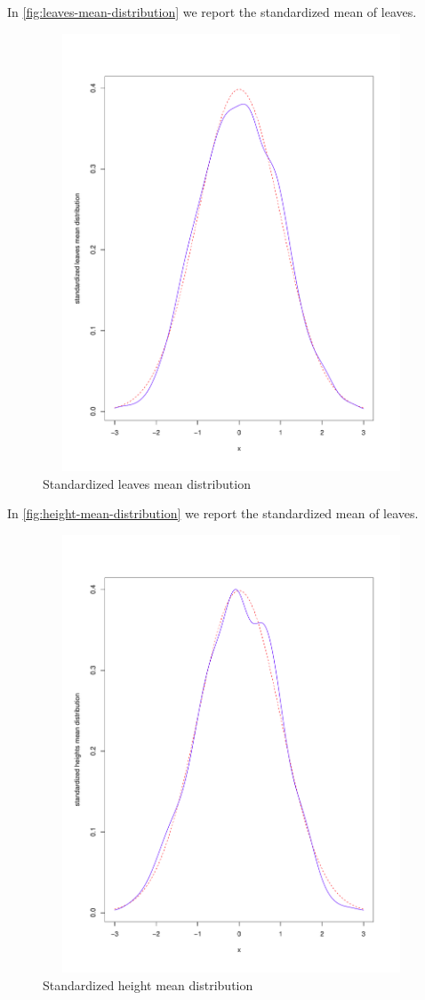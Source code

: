 In \autoref{fig:leaves-mean-distribution} we report the standardized
mean of leaves.
\begin{figure}[htb]
  \centering
  \includegraphics[height=13cm,
  width=13cm]{pictures/repeated-sampling-leaves-mean.pdf}
  \caption{Standardized leaves mean distribution}
  \label{fig:leaves-mean-distribution}
\end{figure}

In \autoref{fig:height-mean-distribution} we report the standardized
mean of leaves.
\begin{figure}[htb]
  \centering
  \includegraphics[height=13cm,
  width=13cm]{pictures/repeated-sampling-height-mean.pdf}
  \caption{Standardized height mean distribution}
  \label{fig:height-mean-distribution}
\end{figure}

